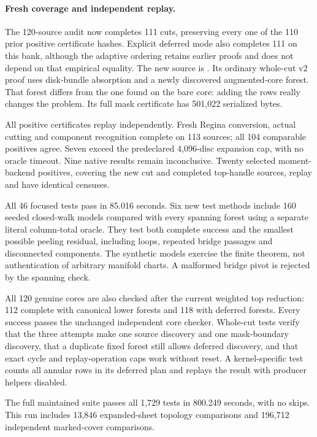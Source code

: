 \paragraph{Fresh coverage and independent replay.}
The 120-source audit now completes 111 cuts, preserving every one of the
110 prior positive certificate hashes. Explicit deferred mode also
completes 111 on this bank, although the adaptive ordering retains earlier
proofs and does not depend on that empirical equality. The new source is
. Its ordinary whole-cut v2 proof uses disk-bundle
absorption and a newly discovered augmented-core forest. That forest differs
from the one found on the bare core: adding the rows really changes the
problem. Its full mask certificate has 501,022 serialized bytes.

All positive certificates replay independently. Fresh Regina conversion,
actual cutting and component recognition complete on 113 sources; all 104
comparable positives agree. Seven exceed the predeclared 4,096-disc
expansion cap, with no oracle timeout. Nine native results remain
inconclusive. Twenty selected moment-backend positives, covering the new
cut and completed top-handle sources, replay and have identical censuses.

All 46 focused tests pass in 85.016 seconds. Six new test methods include
160 seeded closed-walk models compared with every spanning forest using a
separate literal column-total oracle. They test both complete success and
the smallest possible peeling residual, including loops, repeated bridge
passages and disconnected components. The synthetic models exercise the
finite theorem, not authentication of arbitrary manifold charts. A
malformed bridge pivot is rejected by the spanning check.

All 120 genuine cores are also checked after the current weighted top
reduction: 112 complete with canonical lower forests and 118 with deferred
forests. Every success passes the unchanged independent core checker.
Whole-cut tests verify that the three attempts make one source discovery
and one mask-boundary discovery, that a duplicate fixed forest still
allows deferred discovery, and that exact cycle and replay-operation caps
work without reset. A kernel-specific test counts all annular rows in its
deferred plan and replays the result with producer helpers disabled.

The full maintained suite passes all 1,729 tests in 800.249 seconds,
with no skips. This run includes 13,846 expanded-sheet topology comparisons
and 196,712 independent marked-cover comparisons.

